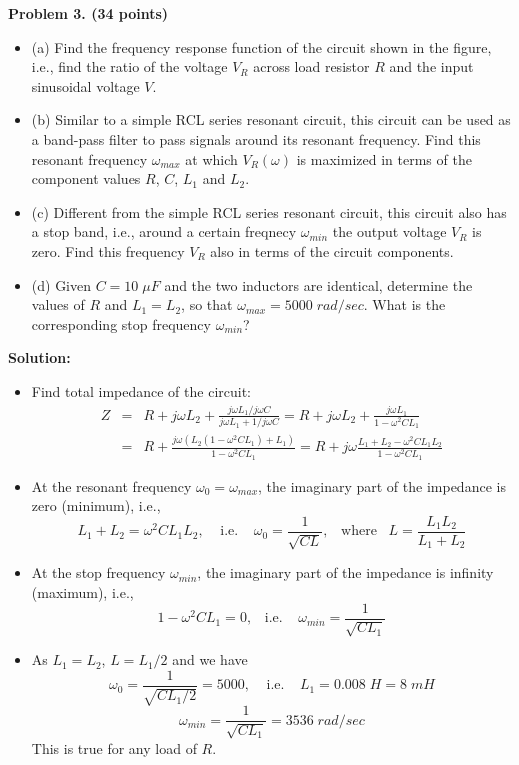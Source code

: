 \item {\bf Problem 3. (34 points)} 

\begin{itemize}
\item (a) Find the frequency response function of the circuit shown in 
the figure, i.e., find the ratio of the voltage $V_R$ across load resistor
$R$ and the input sinusoidal voltage $V$. 

\item (b) Similar to a simple RCL series resonant circuit, this circuit
can be used as a band-pass filter to pass signals around its resonant 
frequency. Find this resonant frequency $\omega_{max}$ at which 
$V_R(\omega)$ is maximized in terms of the component values $R$, $C$, 
$L_1$ and $L_2$. 

\item (c) Different from the simple RCL series resonant circuit, this 
circuit also has a stop band, i.e., around a certain freqnecy 
$\omega_{min}$ the output voltage $V_R$ is zero. Find this frequency 
$V_R$ also in terms of the circuit components. 

\item (d) Given $C=10\;\mu F$ and the two inductors are identical, 
determine the values of $R$ and $L_1=L_2$, so that $\omega_{max}=5000
\;rad/sec$. What is the corresponding stop frequency $\omega_{min}$?

\end{itemize}


  {\bf Solution:}
  \begin{itemize}
  \item Find total impedance of the circuit:
  \begin{eqnarray}
   Z&=&R+j\omega L_2+\frac{j\omega L_1/j\omega C}{j\omega L_1+1/j\omega C}
  	=R+j\omega L_2+\frac{j\omega L_1}{1-\omega^2 CL_1}
  	\nonumber \\
  &=&R+\frac{j\omega(L_2(1-\omega^2CL_1)+L_1)}{1-\omega^2 CL_1}
  =R+j\omega \frac{L_1+L_2-\omega^2CL_1L_2}{1-\omega^2CL_1}
  	\nonumber 
  \end{eqnarray}
  \item At the resonant frequency $\omega_0=\omega_{max}$, the imaginary 
  part of the impedance is zero (minimum), i.e.,
  \[	L_1+L_2=\omega^2CL_1L_2,\;\;\;\;\mbox{i.e.}\;\;\;\;
  	\omega_0=\frac{1}{\sqrt{CL}},\;\;\;\mbox{where}\;\;\;
  	L=\frac{L_1L_2}{L_1+L_2}
  \]
  \item At the stop frequency $\omega_{min}$, the imaginary part of the 
  impedance is infinity (maximum), i.e.,
  \[	1-\omega^2CL_1=0, \;\;\;\mbox{i.e.}\;\;\;\;
  	\omega_{min}=\frac{1}{\sqrt{CL_1}}	\]
  
  \item As $L_1=L_2$, $L=L_1/2$ and we have
  \[ \omega_0=\frac{1}{\sqrt{CL_1/2}}=5000,\;\;\;\;\mbox{i.e.}\;\;\;\;
  	L_1=0.008\;H=8\;mH	\]
  \[ \omega_{min}=\frac{1}{\sqrt{CL_1}}=3536\;rad/sec	\]
  This is true for any load of $R$.
  
  \end{itemize} 

